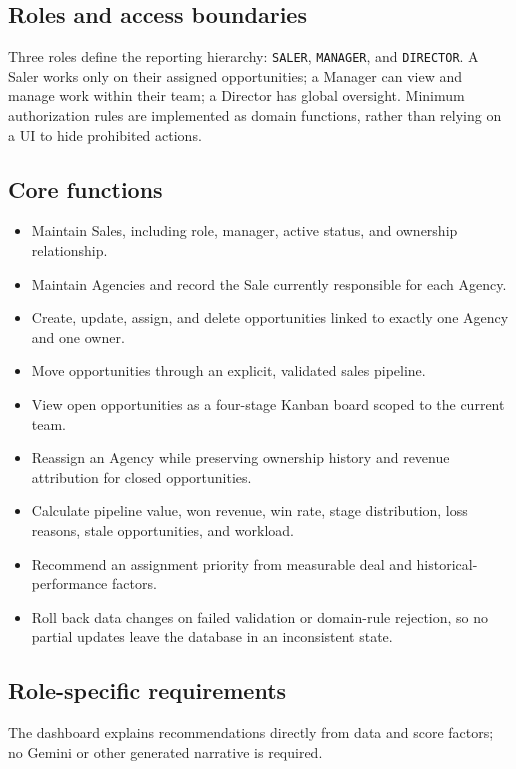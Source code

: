 \documentclass[13pt, a4paper]{article}
\begin{document}
\subsection{Roles and access boundaries}

Three roles define the reporting hierarchy: \texttt{SALER}, \texttt{MANAGER}, and
\texttt{DIRECTOR}. A Saler works only on their assigned opportunities; a Manager can view and
manage work within their team; a Director has global oversight. Minimum authorization rules
are implemented as domain functions, rather than relying on a UI to hide prohibited actions.

\subsection{Core functions}

\begin{itemize}
    \item Maintain Sales, including role, manager, active status, and ownership relationship.
    \item Maintain Agencies and record the Sale currently responsible for each Agency.
    \item Create, update, assign, and delete opportunities linked to exactly one Agency and one owner.
    \item Move opportunities through an explicit, validated sales pipeline.
    \item View open opportunities as a four-stage Kanban board scoped to the current team.
    \item Reassign an Agency while preserving ownership history and revenue attribution for
        closed opportunities.
    \item Calculate pipeline value, won revenue, win rate, stage distribution, loss reasons,
        stale opportunities, and workload.
    \item Recommend an assignment priority from measurable deal and historical-performance
        factors.
    \item Roll back data changes on failed validation or domain-rule rejection, so no partial updates leave the database in an inconsistent state.
\end{itemize}

\subsection{Role-specific requirements}

The dashboard explains recommendations directly from data and score factors; no Gemini or
other generated narrative is required.
\end{document}
